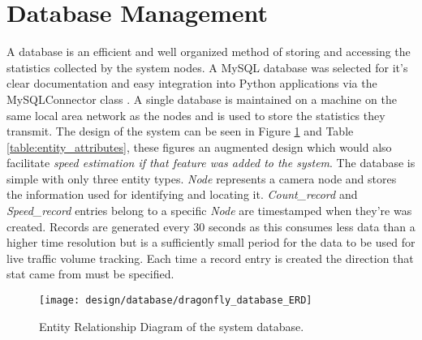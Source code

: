 \section{Database Management}

A database is an efficient and well organized method of storing and accessing the statistics collected by the system nodes. A MySQL database was selected for it's clear documentation and easy integration into Python applications via the MySQLConnector class \cite{mysqlconnector}. A single database is maintained on a machine on the same local area network as the nodes and is used to store the statistics they transmit. The design of the system can be seen in Figure \ref{fig:erd} and Table \ref{table:entity_attributes}, these figures an augmented design which would also facilitate \emph{speed estimation if that feature was added to the system}. The database is simple with only three entity types. \emph{Node} represents a camera node and stores the information used for identifying and locating it. \emph{Count\_record} and \emph{Speed\_record} entries belong to a specific \emph{Node} are timestamped when they're was created. Records are generated every 30 seconds as this consumes less data than a higher time resolution but is a sufficiently small period for the data to be used for live traffic volume tracking. Each time a record entry is created the direction that stat came from must be specified.

\begin{figure}[H]
    \centering
    \centering\texttt{[image: design/database/dragonfly\_database\_ERD]}
    \caption{Entity Relationship Diagram of the system database.}
    \label{fig:erd}
  \end{figure}

